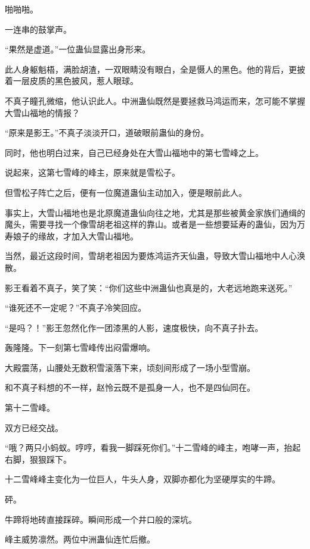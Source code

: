 
\begin{this_body}

啪啪啪。

一连串的鼓掌声。

“果然是虚道。”一位蛊仙显露出身形来。

此人身躯魁梧，满脸胡渣，一双眼睛没有眼白，全是慑人的黑色。他的背后，更披着一层皮质的黑色披风，惹人眼球。

不真子瞳孔微缩，他认识此人。中洲蛊仙既然是要拯救马鸿运而来，怎可能不掌握大雪山福地的情报？

“原来是影王。”不真子淡淡开口，道破眼前蛊仙的身份。

同时，他也明白过来，自己已经身处在大雪山福地中的第七雪峰之上。

说起来，这第七雪峰的峰主，原来就是雪松子。

但雪松子阵亡之后，便有一位魔道蛊仙主动加入，便是眼前此人。

事实上，大雪山福地也是北原魔道蛊仙向往之地，尤其是那些被黄金家族们通缉的魔头，需要寻找一个像雪胡老祖这样的靠山。或者是一些想要延寿的蛊仙，因为万寿娘子的缘故，才加入大雪山福地。

当然，最近这段时间，雪胡老祖因为要炼鸿运齐天仙蛊，导致大雪山福地中人心涣散。

影王看着不真子，笑了笑：“你们这些中洲蛊仙也真是的，大老远地跑来送死。”

“谁死还不一定呢？”不真子冷笑回应。

“是吗？！”影王忽然化作一团漆黑的人影，速度极快，向不真子扑去。

轰隆隆。下一刻第七雪峰传出闷雷爆响。

大殿震荡，山腰处无数积雪滚落下来，顷刻间形成了一场小型雪崩。

和不真子料想的不一样，赵怜云既不是孤身一人，也不是四仙同在。

第十二雪峰。

双方已经交战。

“哦？两只小蚂蚁。哼哼，看我一脚踩死你们。”十二雪峰的峰主，咆哮一声，抬起右脚，狠狠踩下。

十二雪峰峰主变化为一位巨人，牛头人身，双脚亦都化为坚硬厚实的牛蹄。

砰。

牛蹄将地砖直接踩碎。瞬间形成一个井口般的深坑。

峰主威势凛然。两位中洲蛊仙连忙后撤。


\end{this_body}

